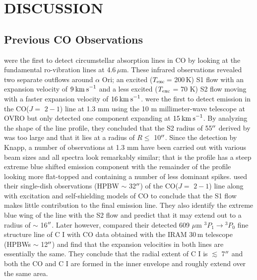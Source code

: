 \documentclass[iop]{emulateapj}
\begin{document}
\section{DISCUSSION}
\subsection{Previous CO Observations}
\cite{1979ApJ...233L.135B} were the first to detect circumstellar absorption lines in CO by looking at the fundamental ro-vibration lines at 4.6$\,\mu$m. These infrared observations revealed two separate outflows around $\alpha$ Ori; an excited (\rm{$T_{\rm{exc}}$}\,= 200\,K) S1 flow with an expansion velocity of $9\>{\rm km\>s}^{-1}$ and a less excited (\rm{$T_{\rm{exc}}$} = 70 K) S2 flow moving with a faster expansion velocity of $16\>{\rm km\>s}^{-1}$. \cite{1980ApJ...242L..25K} were the first to detect emission in the CO($J=$ $2-1$) line at 1.3 mm using the 10 m millimeter-wave telescope at OVRO but only detected one component expanding at $15\>{\rm km\>s}^{-1}$. By analyzing the shape of the line profile, they concluded that the S2 radius of 55$\mbox{$^{\prime\prime}$}$ derived by \cite{1979ApJ...233L.135B} was too large and that it lies at a radius of $R \leq$ 10$\mbox{$^{\prime\prime}$}$. Since the detection by Knapp, a number of observations at 1.3 mm have been carried out with various beam sizes and all spectra look remarkably similar; that is the profile has a steep extreme blue shifted emission component with the remainder of the profile looking more flat-topped and containing a number of less dominant spikes. \cite{1987ApJ...313..400H} used their single-dish observations (HPBW $\sim$ 32$\mbox{$^{\prime\prime}$}$) of the CO($J=$ $2-1$) line along with excitation and self-shielding models of CO to conclude that the S1 flow makes little contribution to the final emission line. They also identify the extreme blue wing of the line with the S2 flow and predict that it may extend out to a radius of $\sim$ 16$\mbox{$^{\prime\prime}$}$. Later however, \cite{1994ApJ...424L.127H} compared their detected 609 $\mu$m ${}^3P{}_1\rightarrow{}^3P{}_0$ fine structure line of C I with CO data obtained with the IRAM 30\,m telescope (HPBWs $\sim$ 12$\mbox{$^{\prime\prime}$}$) and find that the expansion velocities in both lines are essentially the same. They conclude that the radial extent of C I is $\lesssim$ 7$\mbox{$^{\prime\prime}$}$ and both the CO and C I are formed in the inner envelope and roughly extend over the same area.  
\end{document}
